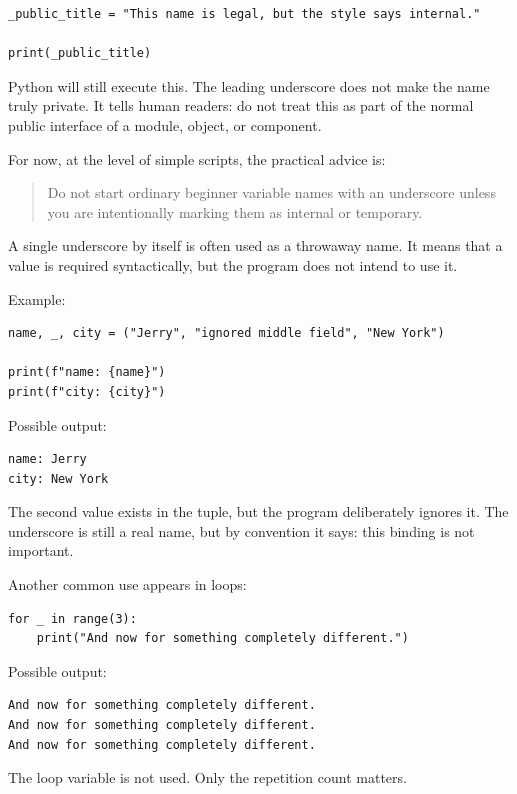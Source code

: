 \begin{verbatim}
_public_title = "This name is legal, but the style says internal."

print(_public_title)
\end{verbatim}

Python will still execute this. The leading underscore does not make the name truly private. It tells human readers: do not treat this as part of the normal public interface of a module, object, or component.

For now, at the level of simple scripts, the practical advice is:

\begin{quote}
Do not start ordinary beginner variable names with an underscore unless you are intentionally marking them as internal or temporary.
\end{quote}

A single underscore by itself is often used as a throwaway name. It means that a value is required syntactically, but the program does not intend to use it.

Example:

\begin{verbatim}
name, _, city = ("Jerry", "ignored middle field", "New York")

print(f"name: {name}")
print(f"city: {city}")
\end{verbatim}

Possible output:

\begin{verbatim}
name: Jerry
city: New York
\end{verbatim}

The second value exists in the tuple, but the program deliberately ignores it. The underscore is still a real name, but by convention it says: this binding is not important.

Another common use appears in loops:

\begin{verbatim}
for _ in range(3):
    print("And now for something completely different.")
\end{verbatim}

Possible output:

\begin{verbatim}
And now for something completely different.
And now for something completely different.
And now for something completely different.
\end{verbatim}

The loop variable is not used. Only the repetition count matters.

